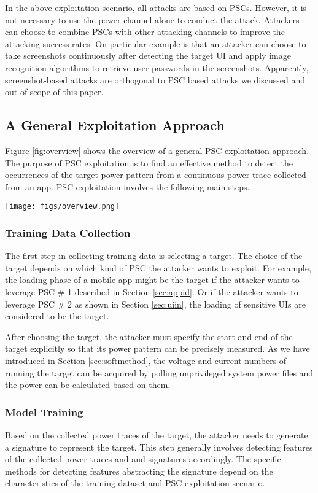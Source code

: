 \documentclass{sig-alternate}
\begin{document}
In the above exploitation scenario, all attacks are based on PSCs. However, it is not necessary to use the power channel alone to conduct the attack. Attackers can choose to combine PSCs with other attacking channels to improve the attacking success rates. 
On particular example is that an attacker can choose to take screenshots continuously after detecting the target UI and apply image recognition algorithms to retrieve user passwords in the screenshots. Apparently,  screenshot-based attacks are orthogonal to PSC based attacks we discussed and out of scope of this paper.  

\subsection{A General Exploitation Approach}
Figure \ref{fig:overview} shows the overview of a general PSC exploitation approach. The purpose of PSC exploitation is to find an effective method to detect the occurrences of the target power pattern from a continuous power trace collected from an app.
PSC exploitation involves the following main steps.

\begin{figure*}[t]
\centering
\texttt{[image: figs/overview.png]}
\caption{An overview of a general PSC exploitation approach.}
\label{fig:overview}
\end{figure*}
\subsubsection{Training Data Collection} 

The first step in collecting training data is selecting a target. The choice of the target depends on which kind of PSC the attacker wants to exploit. For example, the loading phase of a mobile app might be the target if the attacker wants to leverage PSC \# 1 described in Section \ref{sec:appid}. Or if the attacker wants to leverage PSC \# 2 as shown in Section \ref{sec:uiin}, the loading of sensitive UIs are considered to be the target.

After choosing the target, the attacker must specify the start and end of the target explicitly so that its power pattern can be precisely measured. As we have introduced in Section \ref{sec:softmethod}, the voltage and current numbers of running the target can be acquired by polling unprivileged system power files and the power can be calculated based on them.

\subsubsection{Model Training} Based on the collected power traces of the target, the attacker needs to generate a signature to represent the target. This step generally involves detecting features of the collected power traces and and signatures accordingly. The specific methods for detecting features abstracting the signature depend on the characteristics of the training dataset and PSC exploitation scenario. 
\end{document}
